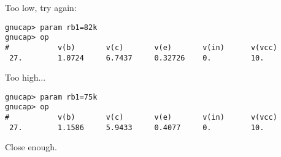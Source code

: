Too low, try again:

\begin{verbatim}
gnucap> param rb1=82k
gnucap> op
#           v(b)       v(c)       v(e)       v(in)      v(vcc)    
 27.        1.0724     6.7437     0.32726    0.         10.       
\end{verbatim}

Too high...


\begin{verbatim}
gnucap> param rb1=75k
gnucap> op
#           v(b)       v(c)       v(e)       v(in)      v(vcc)    
 27.        1.1586     5.9433     0.4077     0.         10.       
\end{verbatim}

Close enough.
